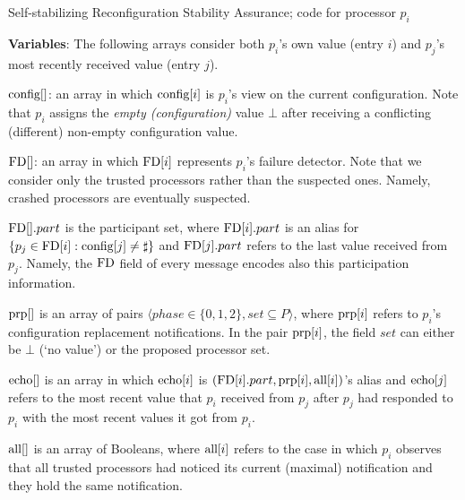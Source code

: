 \documentclass[11pt]{article}
\newcommand{\notif}{prp}
\begin{document}
\begin{algorithm*}[t!]


\caption{Self-stabilizing Reconfiguration Stability Assurance; code for processor $p_i$}
\label{alg:disCongif}
\begin{footnotesize}
{\bf Variables}:
The following arrays consider both $p_i$'s own value (entry $i$) and $p_j$'s most recently received value (entry $j$).  

$\textnormal{config}[]$: an array in which $\textnormal{config}[i]$ is $p_i$'s view on the current configuration.
Note that $p_i$ assigns the \emph{empty (configuration)} value $\bot$ after receiving a conflicting (different) non-empty configuration value. 

$\textnormal{FD}[]$: an array in which $\textnormal{FD}[i]$ represents $p_i$'s failure detector. 
Note that we consider only the trusted processors rather than the suspected ones. Namely, crashed processors are eventually suspected. 

$\textnormal{FD}[].part$ is the participant set, where $\textnormal{FD}[i].part$ is an alias for $\{ p_j \in \textnormal{FD}[i] : \textnormal{config}[j] \neq \sharp \}$ and $\textnormal{FD}[j].part$ refers to the last value received from $p_j$. Namely, the $\textnormal{FD}$ field of every message encodes also this participation information.



$\textnormal{\notif}[]$ is an array of pairs $\langle phase \in \{0,1,2\}, set \subseteq P \rangle$, where $\textnormal{\notif}[i]$ refers to $p_i$'s configuration replacement notifications.
In the pair $\textnormal{\notif}[i]$, the field $set$ can either be $\bot$ (`no value') or the proposed processor set. 


$\textnormal{echo}[]$ is an array in which $\textnormal{echo}[i]$ is $(\textnormal{FD}[i].part, \textnormal{\notif}[i], \textnormal{all}[i])$'s alias and $\textnormal{echo}[j]$ refers to the most recent value that $p_i$ received from $p_j$ after $p_j$ had responded to $p_i$ with the most recent values it got from $p_i$.


$\textnormal{all}[]$ is an array of Booleans, where $\textnormal{all}[i]$ refers to the case in which $p_i$ observes that all trusted processors had noticed its current (maximal) notification and they hold the same notification. 






\end{footnotesize}
\end{algorithm*}
\end{document}
